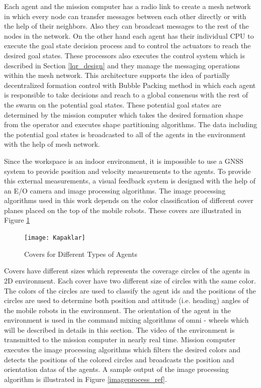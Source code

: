 Each agent and the mission computer has a radio link to create a mesh network in which every node can transfer messages between each other directly or with the help of their neighbors. Also they can broadcast messages to the rest of the nodes in the network.  On the other hand each agent has their individual CPU to execute the goal state decision process and to control the actuators to reach the desired goal states. These processors also executes the control system which is described in Section \ref{lqr_design} and they manage the messaging operations within the mesh network.  This architecture supports the idea of partially decentralized formation control with Bubble Packing method in which each agent is responsible to take decisions and reach to a global consensus with the rest of the swarm on the potential goal states.  These potential goal states are determined by the mission computer which takes the desired formation shape from the operator and executes shape partitioning algorithms. The data including the potential goal states is broadcasted to all of the agents in the environment with the help of mesh network. 

Since the workspace is an indoor environment, it is impossible to use a GNSS system to provide position and velocity measurements to the agents. To provide this external measurements, a visual feedback system is designed with the help of an E/O camera and image processing algorithms.  The image processing algorithms used in this work depends on the color classification of different cover planes placed on the top of the mobile robots. These covers are illustrated in Figure \ref{kapaklar_ref}

\begin{figure}[H]
\caption{Covers for Different Types of Agents} \label{kapaklar_ref}
\centerline{\texttt{[image: Kapaklar]}}
\end{figure} 
		
Covers have different sizes which represents the coverage circles of the agents in 2D environment. Each cover have two different size of circles with the same color. The colors of the circles are used to classify the agent ids and the positions of the circles are used to determine both position and attitude (i.e. heading) angles of the mobile robots in the environment. The orientation of the agent in the environment is used in the command mixing algorithms of omni - wheels which will be described in details in this section. The video of the environment is transmitted to the mission computer in nearly real time. Mission computer executes the image processing algorithms which filters the desired colors and detects the positions of the colored circles and broadcasts the position and orientation datas of the agents. A sample output of the image processing algorithm is illustrated in Figure \ref{imageprocess_ref}. 
		

